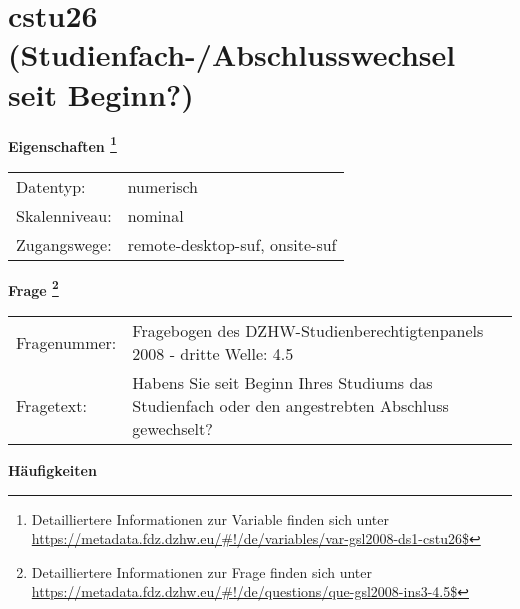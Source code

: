 
    \setcounter{footnote}{0}

    \vspace*{-1.8cm}
	\section{cstu26 (Studienfach-/Abschlusswechsel seit Beginn?)}
	\label{section:cstu26}



    \vspace*{0.5cm}
    \noindent\textbf{Eigenschaften
	\footnote{Detailliertere Informationen zur Variable finden sich unter
		\url{https://metadata.fdz.dzhw.eu/\#!/de/variables/var-gsl2008-ds1-cstu26$}}}\\
	\begin{tabularx}{\hsize}{@{}lX}
	Datentyp: & numerisch \\
	Skalenniveau: & nominal \\
	Zugangswege: &
	  remote-desktop-suf, 
	  onsite-suf
 \\
    \end{tabularx}



				\vspace*{0.5cm}
                \noindent\textbf{Frage
	                \footnote{Detailliertere Informationen zur Frage finden sich unter
		              \url{https://metadata.fdz.dzhw.eu/\#!/de/questions/que-gsl2008-ins3-4.5$}}}\\
				\begin{tabularx}{\hsize}{@{}lX}
					Fragenummer: &
					  Fragebogen des DZHW-Studienberechtigtenpanels 2008 - dritte Welle:
					  4.5
 \\
					Fragetext: & Habens Sie seit Beginn Ihres Studiums das Studienfach oder den angestrebten Abschluss gewechselt? \\
				\end{tabularx}





        		\vspace*{0.5cm}
                \noindent\textbf{Häufigkeiten}

